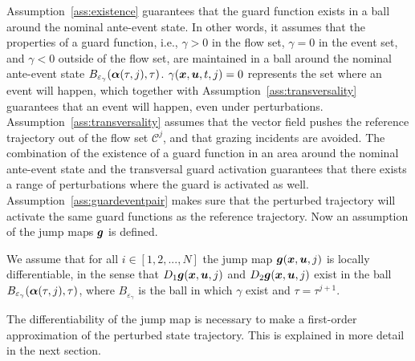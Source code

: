 \documentclass[../DC2017114Bouma.tex]{subfiles}
\begin{document}
Assumption~\ref{ass:existence} guarantees that the guard function exists in a ball around the nominal ante-event state. In other words, it assumes that the properties of a guard function, i.e., $\gamma>0$ in the flow set, $\gamma=0$ in the event set, and $\gamma<0$ outside of the flow set, are maintained in a ball around the nominal ante-event state $B_{\varepsilon_\gamma}(\boldsymbol{\alpha}(\tau,j),\tau)$.  $\gamma({\boldsymbol{x}},{\boldsymbol{u}},t,j) = 0$ represents the set where an event will happen, which together with Assumption~\ref{ass:transversality} guarantees that an event will happen, even under perturbations. Assumption~\ref{ass:transversality} assumes that the vector field pushes the reference trajectory out of the flow set $\mathcal{C}^j$, and that grazing incidents are avoided. The combination of the existence of a guard function in an area around the nominal ante-event state and the transversal guard activation guarantees that there exists a range of perturbations where the guard is activated as well. Assumption~\ref{ass:guardeventpair} makes sure that the perturbed trajectory will activate the same guard functions as the reference trajectory. Now an assumption of the jump maps ${\boldsymbol{g}}$ is defined.

\begin{myass}\label{ass:jump}
We assume that for all $i \in [1,2,...,N]$ the jump map ${\boldsymbol{g}}({\boldsymbol{x}},{\boldsymbol{u}},j)$ is locally differentiable, in the sense that $D_1{\boldsymbol{g}}({\boldsymbol{x}},{\boldsymbol{u}},j)$ and $D_2{\boldsymbol{g}}({\boldsymbol{x}},{\boldsymbol{u}},j)$ exist in the ball $B_{\varepsilon_{\gamma}}(\boldsymbol{\alpha}(\tau,j),\tau)$, where $B_{\varepsilon_{\gamma}}$ is the ball in which $\gamma$ exist and $\tau = \tau^{j+1}$.
\end{myass}

The differentiability of the jump map is necessary to make a first-order approximation of the perturbed state trajectory. This is explained in more detail in the next section.
\end{document}
